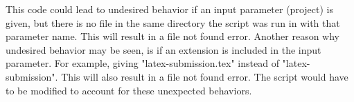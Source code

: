\documentclass{article}
\begin{document}
This code could lead to undesired behavior if an input parameter (project) is given, but there is no file in the same directory the script was run in with that parameter name. This will result in a file not found error. Another reason why undesired behavior may be seen, is if an extension is included in the input parameter. For example, giving "latex-submission.tex" instead of "latex-submission". This will also result in a file not found error. The script would have to be modified to account for these unexpected behaviors.
\end{document}
